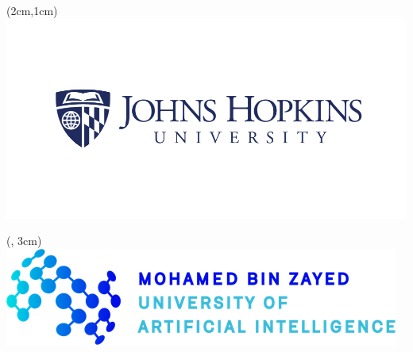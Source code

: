\documentclass[24pt,final]{beamer}
\newlength{\onecolwid}
\newlength{\twocolwid}
\begin{document}
\begin{frame}[t]
\begin{columns}[t]
\begin{column}{\twocolwid}
\begin{columns}[t,totalwidth=\twocolwid]
\begin{column}{\onecolwid}
{\begin{enumerate}[label={[\arabic*]}]
\end{enumerate}}
    
\end{column}

\end{columns}
  
  \end{column}
		
  \end{columns}
	
	
	
	\begin{textblock*}{\onecolwid}(2cm,1cm)
		\includegraphics[width=0.56\linewidth]{Figures/logoJHU.jpg}
	\end{textblock*}
	\begin{textblock*}{\onecolwid}(\paperwidth -16cm, 3cm)
		\includegraphics[width=0.54\linewidth]{Figures/logoMBZUAI.png}
	\end{textblock*}
\end{frame} %
\end{document}

